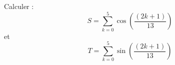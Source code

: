%
%
	Calculer :
	$$S = \sum\limits_{k=0}^{5} \cos(\frac{(2k+1)}{13})$$
	et
	$$T = \sum\limits_{k=0}^{5} \sin(\frac{(2k+1)}{13})$$
